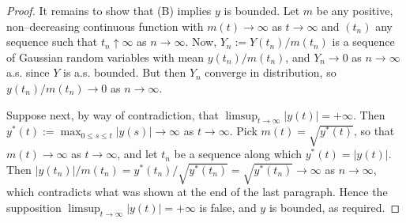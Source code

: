\documentclass[a4paper,10pt,reqno]{amsart}
\numberwithin{equation}{section}
\newtheorem{theorem}{Theorem}
\theoremstyle{definition}
\theoremstyle{remark}
\DeclareMathOperator{\1}{\mathbbm 1}
\begin{document}
\begin{proof}
It remains to show that (B) implies  $y$ is bounded. Let $m$ be any positive, non--decreasing continuous function with $m(t)\to \infty$ as $t\to\infty$ 
and $(t_n)$ any sequence such that $t_n\uparrow \infty$ as $n\to\infty$. 
Now, $Y_n:=Y(t_n)/m(t_n)$ is a sequence of Gaussian random variables with mean $y(t_n)/m(t_n)$, and $Y_n\to 0$ as $n\to\infty$ a.s. since $Y$ is a.s. bounded. But then $Y_n$ converge in distribution, so $y(t_n)/m(t_n)\to 0$ as $n\to\infty$.   

Suppose next, by way of contradiction, that $\limsup_{t\to\infty} |y(t)|=+\infty$. Then $y^\ast(t):=\max_{0\leq s\leq t} |y(s)|\to\infty$ as $t\to\infty$. Pick $m(t)=\sqrt{y^\ast(t)}$, so that $m(t)\to\infty$ as $t\to\infty$, and let $t_n$ be a sequence along which $y^\ast(t) = |y(t)|$. Then 
$|y(t_n)|/m(t_n) = y^\ast(t_n)/\sqrt{y^\ast(t_n)} = \sqrt{y^\ast(t_n)}\to \infty$ as $n\to\infty$, 
which contradicts what was shown at the end of the last paragraph. Hence the supposition $\limsup_{t\to\infty} |y(t)|=+\infty$ is false, and $y$ is bounded, as required. 
\end{proof}
%
\end{document}
